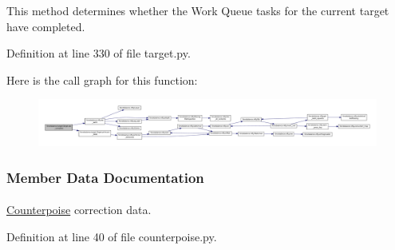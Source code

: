 \-This method determines whether the \-Work \-Queue tasks for the current target have completed. 



\-Definition at line 330 of file target.\-py.



\-Here is the call graph for this function\-:\nopagebreak
\begin{figure}[H]
\begin{center}
\leavevmode
\includegraphics[width=350pt]{classforcebalance_1_1target_1_1Target_af6099ec09486213869dba2491bd8ea04_cgraph}
\end{center}
\end{figure}




\subsubsection{\-Member \-Data \-Documentation}
\hypertarget{classforcebalance_1_1counterpoise_1_1Counterpoise_ae7622f5b81661b6c993fb1eae9b5a2dd}{
\paragraph[{cpqm}]{}}\label{classforcebalance_1_1counterpoise_1_1Counterpoise_ae7622f5b81661b6c993fb1eae9b5a2dd}


\hyperlink{classforcebalance_1_1counterpoise_1_1Counterpoise}{\-Counterpoise} correction data. 



\-Definition at line 40 of file counterpoise.\-py.

\hypertarget{classforcebalance_1_1target_1_1Target_a796dc30a19a60c63fb43b088d40a963f}{
\paragraph[{\-F\-F}]{}}\label{classforcebalance_1_1target_1_1Target_a796dc30a19a60c63fb43b088d40a963f}


